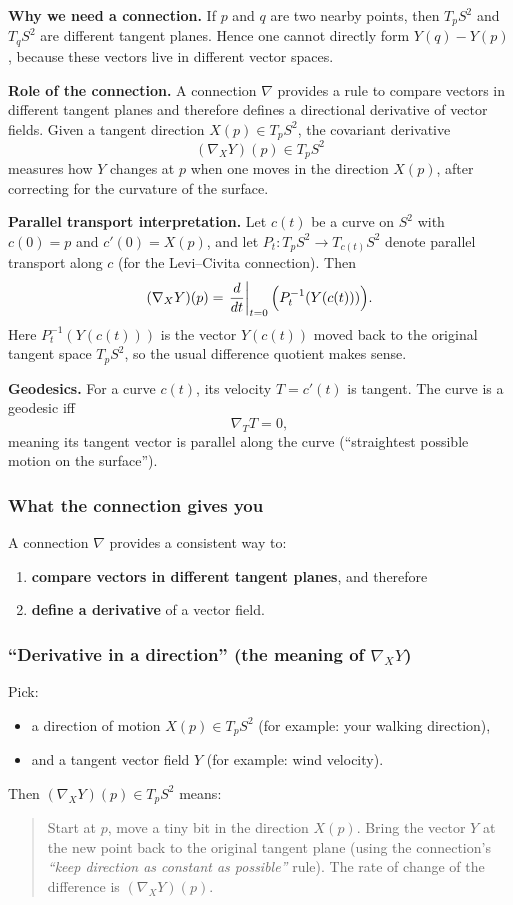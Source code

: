\documentclass[12pt,a4paper]{article}
\theoremstyle{plain}
\theoremstyle{definition}      %
\begin{document}
	\medskip
	\noindent
	\textbf{Why we need a connection.}
	If $p$ and $q$ are two nearby points, then $T_pS^2$ and $T_qS^2$ are different tangent planes. Hence one cannot
	directly form $Y(q)-Y(p)$, because these vectors live in different vector spaces.
	
	\medskip
	\noindent
	\textbf{Role of the connection.}
	A connection $\nabla$ provides a rule to compare vectors in different tangent planes and therefore defines a
	directional derivative of vector fields. Given a tangent direction $X(p)\in T_pS^2$, the covariant derivative
	\[
	(\nabla_XY)(p)\in T_pS^2
	\]
	measures how $Y$ changes at $p$ when one moves in the direction $X(p)$, after correcting for the curvature of the
	surface.
	
	\medskip
	\noindent
	\textbf{Parallel transport interpretation.}
	Let $c(t)$ be a curve on $S^2$ with $c(0)=p$ and $c'(0)=X(p)$, and let
	$P_t:T_pS^2\to T_{c(t)}S^2$ denote parallel transport along $c$ (for the Levi--Civita connection).
	Then
	\[
	(\nabla_XY)(p)
	=
	\left.\frac{d}{dt}\right|_{t=0}\Bigl(P_t^{-1}(Y(c(t)))\Bigr).
	\]
	Here $P_t^{-1}(Y(c(t)))$ is the vector $Y(c(t))$ moved back to the original tangent space $T_pS^2$, so the usual
	difference quotient makes sense.
	
	\medskip
	\noindent
	\textbf{Geodesics.}
	For a curve $c(t)$, its velocity $T=c'(t)$ is tangent. The curve is a geodesic iff
	\[
	\nabla_TT=0,
	\]
	meaning its tangent vector is parallel along the curve (``straightest possible motion on the surface'').
	
	\subsubsection*{What the connection gives you}
	
	A connection $\nabla$ provides a consistent way to:
	\begin{enumerate}
		\item \textbf{compare vectors in different tangent planes}, and therefore
		\item \textbf{define a derivative} of a vector field.
	\end{enumerate}
	
	\subsubsection*{``Derivative in a direction'' (the meaning of $\nabla_XY$)}
	
	Pick:
	\begin{itemize}
		\item a direction of motion $X(p)\in T_pS^2$ (for example: your walking direction),
		\item and a tangent vector field $Y$ (for example: wind velocity).
	\end{itemize}
	Then $(\nabla_XY)(p)\in T_pS^2$ means:
	\begin{quote}
		Start at $p$, move a tiny bit in the direction $X(p)$.
		Bring the vector $Y$ at the new point back to the original tangent plane (using the connection's
		\emph{``keep direction as constant as possible''} rule).
		The rate of change of the difference is $(\nabla_XY)(p)$.
	\end{quote}
	
\end{document}
